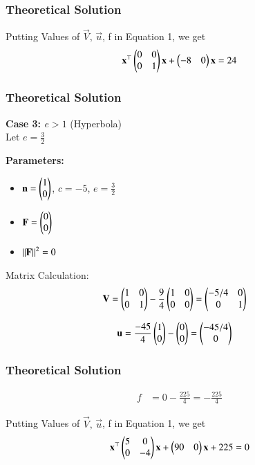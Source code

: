 \documentclass{beamer}
\begin{document}
\begin{frame}[fragile]
    \frametitle{Theoretical Solution}
Putting Values of $\vec{V}, \, \vec{u}$, f in Equation 1, we get
\begin{equation}
\mathbf{x}^\top\begin{pmatrix}0 & 0 \\ 0 & 1\end{pmatrix}\mathbf{x} + \begin{pmatrix}-8 & 0\end{pmatrix}\mathbf{x} = 24
\end{equation}
\end{frame}

\begin{frame}[fragile]
    \frametitle{Theoretical Solution}
    \textbf{Case 3: $e > 1$} (Hyperbola)\\
Let $e = \frac{3}{2}$

\textbf{Parameters:}
\begin{itemize}
\item $\mathbf{n} = \begin{pmatrix}1 \\ 0\end{pmatrix}$, $c = -5$, $e = \frac{3}{2}$
\item $\mathbf{F} = \begin{pmatrix}0 \\ 0\end{pmatrix}$
\item $\left\lVert\mathbf{F}\right\rVert^2 = 0$
\end{itemize}
Matrix Calculation:
\begin{align}
\mathbf{V} &= \begin{pmatrix}1 & 0 \\ 0 & 1\end{pmatrix} - \frac{9}{4}\begin{pmatrix}1 & 0 \\ 0 & 0\end{pmatrix} = \begin{pmatrix}-5/4 & 0 \\ 0 & 1\end{pmatrix}
\end{align}

\begin{align}
\mathbf{u} &= \frac{-45}{4}\begin{pmatrix}1 \\ 0\end{pmatrix} - \begin{pmatrix}0 \\ 0\end{pmatrix} = \begin{pmatrix}-45/4 \\ 0\end{pmatrix}
\end{align}
\end{frame}

\begin{frame}[fragile]
    \frametitle{Theoretical Solution}
\begin{align}
f &= 0 - \frac{225}{4} = -\frac{225}{4}
\end{align}

Putting Values of $\vec{V}, \, \vec{u}$, f in Equation 1, we get
\begin{equation}
\mathbf{x}^\top\begin{pmatrix}5 & 0 \\ 0 & -4\end{pmatrix}\mathbf{x} + \begin{pmatrix}90 & 0\end{pmatrix}\mathbf{x} + 225 = 0
\end{equation}

\end{frame}
\end{document}
